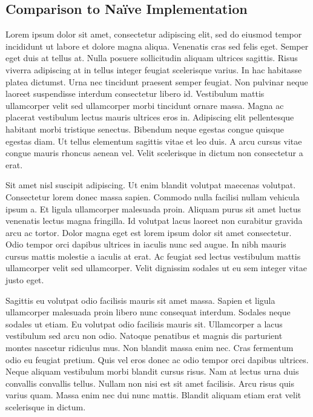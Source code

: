 \documentclass[12pt]{article}
\begin{document}
\subsection{Comparison to Naïve Implementation}
Lorem ipsum dolor sit amet, consectetur adipiscing elit, sed do eiusmod tempor incididunt ut labore et dolore magna aliqua. Venenatis cras sed felis eget. Semper eget duis at tellus at. Nulla posuere sollicitudin aliquam ultrices sagittis. Risus viverra adipiscing at in tellus integer feugiat scelerisque varius. In hac habitasse platea dictumst. Urna nec tincidunt praesent semper feugiat. Non pulvinar neque laoreet suspendisse interdum consectetur libero id. Vestibulum mattis ullamcorper velit sed ullamcorper morbi tincidunt ornare massa. Magna ac placerat vestibulum lectus mauris ultrices eros in. Adipiscing elit pellentesque habitant morbi tristique senectus. Bibendum neque egestas congue quisque egestas diam. Ut tellus elementum sagittis vitae et leo duis. A arcu cursus vitae congue mauris rhoncus aenean vel. Velit scelerisque in dictum non consectetur a erat.\par
Sit amet nisl suscipit adipiscing. Ut enim blandit volutpat maecenas volutpat. Consectetur lorem donec massa sapien. Commodo nulla facilisi nullam vehicula ipsum a. Et ligula ullamcorper malesuada proin. Aliquam purus sit amet luctus venenatis lectus magna fringilla. Id volutpat lacus laoreet non curabitur gravida arcu ac tortor. Dolor magna eget est lorem ipsum dolor sit amet consectetur. Odio tempor orci dapibus ultrices in iaculis nunc sed augue. In nibh mauris cursus mattis molestie a iaculis at erat. Ac feugiat sed lectus vestibulum mattis ullamcorper velit sed ullamcorper. Velit dignissim sodales ut eu sem integer vitae justo eget.\par
Sagittis eu volutpat odio facilisis mauris sit amet massa. Sapien et ligula ullamcorper malesuada proin libero nunc consequat interdum. Sodales neque sodales ut etiam. Eu volutpat odio facilisis mauris sit. Ullamcorper a lacus vestibulum sed arcu non odio. Natoque penatibus et magnis dis parturient montes nascetur ridiculus mus. Non blandit massa enim nec. Cras fermentum odio eu feugiat pretium. Quis vel eros donec ac odio tempor orci dapibus ultrices. Neque aliquam vestibulum morbi blandit cursus risus. Nam at lectus urna duis convallis convallis tellus. Nullam non nisi est sit amet facilisis. Arcu risus quis varius quam. Massa enim nec dui nunc mattis. Blandit aliquam etiam erat velit scelerisque in dictum.\par
\end{document}
